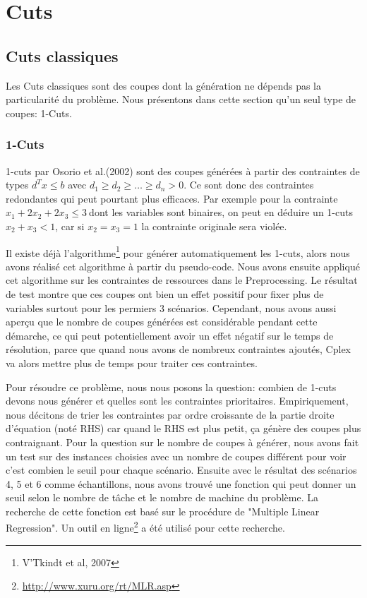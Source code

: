 \documentclass[twoside,fleqn]{EPURapport}
\begin{document}
\chapter{Cuts}%
\section{Cuts classiques}
Les Cuts classiques sont des coupes dont la génération ne dépends pas la particularité du problème. Nous présentons dans cette section qu'un seul type de coupes: 1-Cuts.
\subsection{1-Cuts}
1-cuts par Osorio et al.(2002) sont des coupes générées à partir des contraintes de types $d^Tx \leq b$ avec $d_1  \geq d_2 \geq \dots \geq d_n > 0$. Ce sont donc des contraintes redondantes qui peut pourtant plus efficaces. Par exemple pour la contrainte $x_1+2x_2+2x_3\leq 3 \ $dont les variables sont binaires, on peut en déduire un 1-cuts $x_2+x_3 < 1$, car si $x_2 = x_3=1$ la contrainte originale sera violée.

Il existe déjà l'algorithme\footnote{V'Tkindt et al, 2007} pour générer automatiquement les 1-cuts, alors nous avons réalisé cet algorithme à partir du pseudo-code. Nous avons ensuite appliqué cet algorithme sur les contraintes de ressources dans le Preprocessing. Le résultat de test montre que ces coupes ont bien un effet possitif pour fixer plus de variables surtout pour les permiers 3 scénarios. Cependant, nous avons aussi aperçu que le nombre de coupes générées est considérable pendant cette démarche, ce qui peut potentiellement avoir un effet négatif sur le temps de résolution, parce que quand nous avons de nombreux contraintes ajoutés, Cplex va alors mettre plus de temps pour traiter ces contraintes.

Pour résoudre ce problème, nous nous posons la question: combien de 1-cuts devons nous générer et quelles sont les contraintes prioritaires. Empiriquement, nous décitons de trier les contraintes par ordre croissante de la partie droite d'équation (noté RHS) car quand le RHS est plus petit, ça génère des coupes plus contraignant. Pour la question sur le nombre de coupes à générer, nous avons fait un test sur des instances choisies avec un nombre de coupes différent pour voir c'est combien le seuil pour chaque scénario. Ensuite avec le résultat des scénarios 4, 5 et 6 comme échantillons, nous avons trouvé une fonction qui peut donner un seuil selon le nombre de tâche et le nombre de machine du problème. La recherche de cette fonction est basé sur le procédure de "Multiple Linear Regression". Un outil en ligne\footnote{\url{http://www.xuru.org/rt/MLR.asp}} a été utilisé pour cette recherche.
\end{document}
